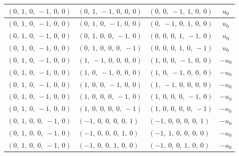 \documentclass[11pt]{article}
\theoremstyle{definition}
\begin{document}
\begin{longtable}{|l|l|l|c|}
    \hline
    $\left( 0, \  1, \  0, \  -1, \  0, \  0\right)$ & $\left( 0, \  1, \  -1, \  0, \  0, \  0\right)$ & $\left( 0, \  0, \  -1, \  1, \  0, \  0\right)$ & $u_{0}$ \\
    \hline
    $\left( 0, \  1, \  0, \  -1, \  0, \  0\right)$ & $\left( 0, \  1, \  0, \  -1, \  0, \  0\right)$ & $\left( 0, \  -1, \  0, \  1, \  0, \  0\right)$ & $u_{0}$ \\
    \hline
    $\left( 0, \  1, \  0, \  -1, \  0, \  0\right)$ & $\left( 0, \  1, \  0, \  0, \  -1, \  0\right)$ & $\left( 0, \  0, \  0, \  1, \  -1, \  0\right)$ & $u_{0}$ \\
    \hline
    $\left( 0, \  1, \  0, \  -1, \  0, \  0\right)$ & $\left( 0, \  1, \  0, \  0, \  0, \  -1\right)$ & $\left( 0, \  0, \  0, \  1, \  0, \  -1\right)$ & $u_{0}$ \\
    \hline
    $\left( 0, \  1, \  0, \  -1, \  0, \  0\right)$ & $\left( 1, \  -1, \  0, \  0, \  0, \  0\right)$ & $\left( 1, \  0, \  0, \  -1, \  0, \  0\right)$ & $- u_{0}$ \\
    \hline
    $\left( 0, \  1, \  0, \  -1, \  0, \  0\right)$ & $\left( 1, \  0, \  -1, \  0, \  0, \  0\right)$ & $\left( 1, \  0, \  -1, \  0, \  0, \  0\right)$ & $- u_{0}$ \\
    \hline
    $\left( 0, \  1, \  0, \  -1, \  0, \  0\right)$ & $\left( 1, \  0, \  0, \  -1, \  0, \  0\right)$ & $\left( 1, \  -1, \  0, \  0, \  0, \  0\right)$ & $- u_{0}$ \\
    \hline
    $\left( 0, \  1, \  0, \  -1, \  0, \  0\right)$ & $\left( 1, \  0, \  0, \  0, \  -1, \  0\right)$ & $\left( 1, \  0, \  0, \  0, \  -1, \  0\right)$ & $- u_{0}$ \\
    \hline
    $\left( 0, \  1, \  0, \  -1, \  0, \  0\right)$ & $\left( 1, \  0, \  0, \  0, \  0, \  -1\right)$ & $\left( 1, \  0, \  0, \  0, \  0, \  -1\right)$ & $- u_{0}$ \\
    \hline
    $\left( 0, \  1, \  0, \  0, \  -1, \  0\right)$ & $\left( -1, \  0, \  0, \  0, \  0, \  1\right)$ & $\left( -1, \  0, \  0, \  0, \  0, \  1\right)$ & $- u_{0}$ \\
    \hline
    $\left( 0, \  1, \  0, \  0, \  -1, \  0\right)$ & $\left( -1, \  0, \  0, \  0, \  1, \  0\right)$ & $\left( -1, \  1, \  0, \  0, \  0, \  0\right)$ & $- u_{0}$ \\
    \hline
    $\left( 0, \  1, \  0, \  0, \  -1, \  0\right)$ & $\left( -1, \  0, \  0, \  1, \  0, \  0\right)$ & $\left( -1, \  0, \  0, \  1, \  0, \  0\right)$ & $- u_{0}$ \\

\end{longtable}
\end{document}
